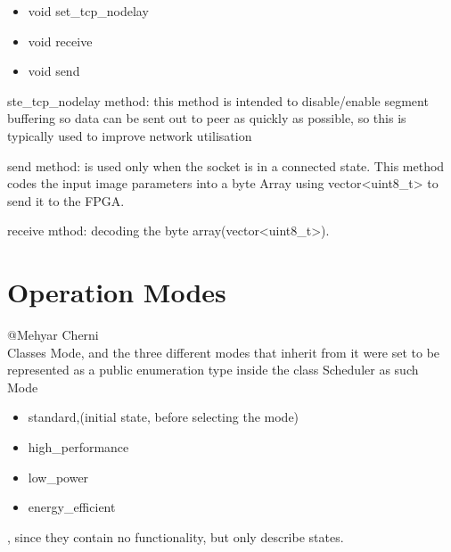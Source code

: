 \documentclass[parskip=full]{scrartcl}
\newcommand\tab[1][1cm]{\hspace*{#1}}
\begin{document}
\begin {itemize}
	\item void set_tcp_nodelay
	\item void receive
	\item void send
\end{itemize}

ste_tcp_nodelay method: this method is intended to disable/enable segment buffering so data can be sent out to peer as quickly as possible, so this is typically used to improve network utilisation

send method:  is used only when the socket is in a connected state. This method codes the input image parameters into a byte Array using vector<uint8_t> to send it to the FPGA.

receive mthod: decoding the byte array(vector<uint8_t>).

\pagebreak

\section{Operation Modes} \label{Operation Modes}
	@Mehyar Cherni\\
	\tab Classes Mode, and the three different modes that inherit from it were set to be represented as a public enumeration type inside the class Scheduler as such \\ Mode
	\begin {itemize}
		\item standard,(initial state, before selecting the mode)
		\item high\_performance 
		\item low\_power
		\item energy\_efficient
	\end{itemize} 
	 , since they contain no functionality, but only describe states.


\pagebreak
\end{document}
